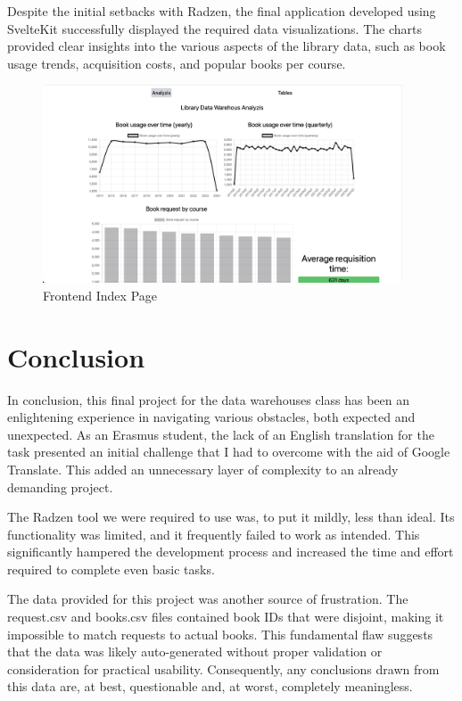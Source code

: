 \documentclass[12pt]{report}
\begin{document}
Despite the initial setbacks with Radzen, the final application developed using SvelteKit successfully displayed the required data visualizations. The charts provided clear insights into the various aspects of the library data, such as book usage trends, acquisition costs, and popular books per course.

\begin{figure}[!ht]
    \begin{center}
        \includegraphics[width=0.95\textwidth]{figures/frontend.png}
    \end{center}
    \caption{Frontend Index Page}\label{fig:frontend}
\end{figure}


\chapter{Conclusion} %
\label{chap:Conclusion}

In conclusion, this final project for the data warehouses class has been an enlightening experience in navigating various obstacles, both expected and unexpected. As an Erasmus student, the lack of an English translation for the task presented an initial challenge that I had to overcome with the aid of Google Translate. This added an unnecessary layer of complexity to an already demanding project.

The Radzen tool we were required to use was, to put it mildly, less than ideal. Its functionality was limited, and it frequently failed to work as intended. This significantly hampered the development process and increased the time and effort required to complete even basic tasks.

The data provided for this project was another source of frustration. The request.csv and books.csv files contained book IDs that were disjoint, making it impossible to match requests to actual books. This fundamental flaw suggests that the data was likely auto-generated without proper validation or consideration for practical usability. Consequently, any conclusions drawn from this data are, at best, questionable and, at worst, completely meaningless.
\end{document}
